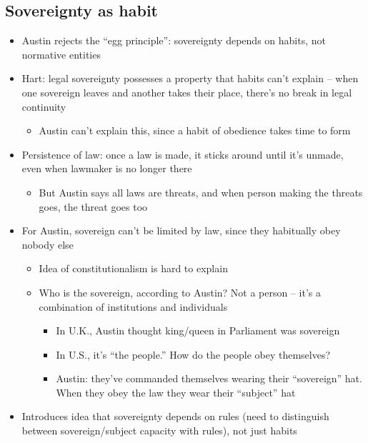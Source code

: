 \hypertarget{sovereignty-as-habit}{%
\subsection{Sovereignty as habit}\label{sovereignty-as-habit}}

\begin{itemize}
\tightlist
\item
  Austin rejects the ``egg principle'': sovereignty depends on habits,
  not normative entities
\item
  Hart: legal sovereignty possesses a property that habits can't explain
  -- when one sovereign leaves and another takes their place, there's no
  break in legal continuity

  \begin{itemize}
  \tightlist
  \item
    Austin can't explain this, since a habit of obedience takes time to
    form
  \end{itemize}
\item
  Persistence of law: once a law is made, it sticks around until it's
  unmade, even when lawmaker is no longer there

  \begin{itemize}
  \tightlist
  \item
    But Austin says all laws are threats, and when person making the
    threats goes, the threat goes too
  \end{itemize}
\item
  For Austin, sovereign can't be limited by law, since they habitually
  obey nobody else

  \begin{itemize}
  \tightlist
  \item
    Idea of constitutionalism is hard to explain
  \item
    Who is the sovereign, according to Austin? Not a person -- it's a
    combination of institutions and individuals

    \begin{itemize}
    \tightlist
    \item
      In U.K., Austin thought king/queen in Parliament was sovereign
    \item
      In U.S., it's ``the people.'' How do the people obey themselves?
    \item
      Austin: they've commanded themselves wearing their ``sovereign''
      hat. When they obey the law they wear their ``subject'' hat
    \end{itemize}
  \end{itemize}
\item
  Introduces idea that sovereignty depends on rules (need to distinguish
  between sovereign/subject capacity with rules), not just habits
\end{itemize}

